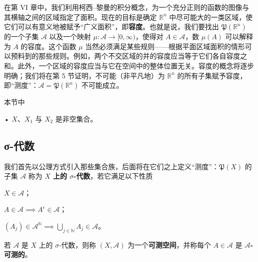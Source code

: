 在第 VI 章中，我们利用柯西–黎曼的积分概念，为一个充分正则的函数的图像与其横轴之间的区域指定了面积。现在的目标是确定 $ \mathbb{R}^{n} $ 中尽可能大的一类区域，使它们可以有意义地被赋予“广义面积”，即\textbf{容度}。也就是说，我们要找出 $ \mathfrak{P}(\mathbb{R}^{n}) $ 的一个子集 $ \mathcal{A} $ 以及一个映射 $ \mu: \mathcal{A} \to [0, \infty) $，使得对 $ A \in \mathcal{A} $，数 $ \mu(A) $ 可以解释为 $ A $ 的容度。这个函数 $ \mu $ 当然必须满足某些规则——根据平面区域面积的情形可以预料到的那些规则。例如，两个不交区域的并的容度应当等于它们各自容度之和。此外，一个区域的容度应当与它在空间中的整体位置无关。容度的概念将逐步明确；我们将在第 5 节证明，不可能（非平凡地）为 $ \mathbb{R}^{n} $ 的所有子集赋予容度，即“测度”：$ \mathcal{A} = \mathfrak{P}(\mathbb{R}^{n}) $ 不可能成立。

本节中

• $ X $、$ X_{1} $ 与 $ X_{2} $ 是非空集合。

\subsection*{σ-代数}

我们首先以公理方式引入那些集合族，后面将在它们之上定义“测度”：$ \mathfrak{P}(X) $ 的子集 $ \mathcal{A} $ 称为 \textbf{$ X $ 上的 $ \sigma $-代数}，若它满足以下性质

\begin{subitems}
\item

$ X \in \mathcal{A} $；

\item

$ A \in \mathcal{A} \implies A^{c} \in \mathcal{A} $；

\item

$ (A_{j}) \in \mathcal{A}^{\mathbb{N}} \implies \bigcup_{j \in \mathbb{N}} A_{j} \in \mathcal{A} $。

\end{subitems}

若 $ \mathcal{A} $ 是 $ X $ 上的 $ \sigma $-代数，则称 $ (X, \mathcal{A}) $ 为一个\textbf{可测空间}，并称每个 $ A \in \mathcal{A} $ 是 \textbf{$ \mathcal{A} $-可测的}。

